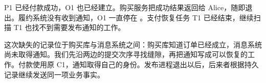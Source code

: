 \newcommand{\CNineFigure}[3]{%
  \begin{figure}[htbp]
  \centering
  \begingroup
  \definecolor{Blue}{HTML}{315E76}
  \definecolor{Pale}{HTML}{F1F5F7}
  \definecolor{Gold}{HTML}{A96B34}
  \tikzset{every node/.style={font=\small\sffamily,align=center},
    box/.style={draw=Blue,rounded corners=2pt,fill=Pale,inner sep=7pt,text width=3.6cm,minimum height=1cm},
    good/.style={box,fill=green!5!white,draw=green!35!black},
    warn/.style={box,fill=orange!7,draw=Gold},
    arr/.style={-{Stealth[length=2mm]},thick,draw=Blue},
    note/.style={font=\footnotesize\sffamily,align=center,text=black!75},
    lane/.style={draw=black!35,densely dashed}}
  \resizebox{.98\linewidth}{!}{}
  \endgroup
  \caption{#2}\label{#3}
  \end{figure}}

P1 已经付款成功，O1 也已经建立。购买服务把成功结果返回给 Alice，随即退出。履约系统没有收到通知，O1 一直停在 。支付恢复任务 T1 已经结束，继续扫描 T1 也找不到需要发布通知的工作。

这次缺失的记录位于购买库与消息系统之间：购买库知道订单已经成立，消息系统尚未取得通知。我们先沿两边的提交次序寻找缝隙，再把通知写成可以恢复的工作。付款使用原 C1，通知取得自己的身份。发布进程退出以后，后来者根据持久记录继续发送同一项业务事实。
